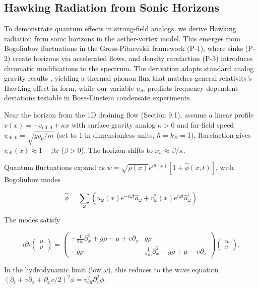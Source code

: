 \documentclass{article}
\begin{document}
\subsection{Hawking Radiation from Sonic Horizons}

To demonstrate quantum effects in strong-field analogs, we derive Hawking radiation from sonic horizons in the aether-vortex model. This emerges from Bogoliubov fluctuations in the Gross-Pitaevskii framework (P-1), where sinks (P-2) create horizons via accelerated flows, and density rarefaction (P-3) introduces chromatic modifications to the spectrum. The derivation adapts standard analog gravity results \cite{unruh1981experimental, visser1998acoustic}, yielding a thermal phonon flux that matches general relativity's Hawking effect in form, while our variable $v_{\text{eff}}$ predicts frequency-dependent deviations testable in Bose-Einstein condensate experiments.

Near the horizon from the 1D draining flow (Section 9.1), assume a linear profile $v(x) = -v_{\text{eff},0} + \kappa x$ with surface gravity analog $\kappa > 0$ and far-field speed $v_{\text{eff},0} = \sqrt{g \rho_0 / m}$ (set to 1 in dimensionless units, $\hbar = k_B = 1$). Rarefaction gives $v_{\text{eff}}(x) \approx 1 - \beta x$ ($\beta > 0$). The horizon shifts to $x_h \approx \beta / \kappa$.

Quantum fluctuations expand as $\psi = \sqrt{\rho(x)} e^{i \theta(x)} [1 + \hat{\phi}(x,t)]$, with Bogoliubov modes

\[
\hat{\phi} = \sum_\omega (u_\omega(x) e^{-i\omega t} \hat{a}_\omega + v_\omega^*(x) e^{i\omega t} \hat{a}_\omega^\dagger)
\]

The modes satisfy

\[
i \partial_t \begin{pmatrix} u \\ v \end{pmatrix} = \begin{pmatrix} -\frac{1}{2m} \partial_x^2 + g \rho - \mu + v \partial_x & g \rho \\ -g \rho & \frac{1}{2m} \partial_x^2 - g \rho + \mu - v \partial_x \end{pmatrix} \begin{pmatrix} u \\ v \end{pmatrix}.
\]

In the hydrodynamic limit (low $\omega$), this reduces to the wave equation $(\partial_t + v \partial_x + \partial_x v / 2)^2 \phi = v_{\text{eff}}^2 \partial_x^2 \phi$.
\end{document}
